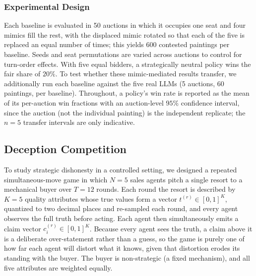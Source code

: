 \documentclass[conference]{IEEEtran}
\begin{document}
\subsubsection{Experimental Design}
Each baseline is evaluated in 50 auctions in which it occupies one seat and four mimics fill the rest, with the displaced mimic rotated so that each of the five is replaced an equal number of times; this yields 600 contested paintings per baseline. Seeds and seat permutations are varied across auctions to control for turn-order effects. With five equal bidders, a strategically neutral policy wins the fair share of $20\%$. To test whether these mimic-mediated results transfer, we additionally run each baseline against the five real LLMs (5 auctions, 60 paintings, per baseline). Throughout, a policy's win rate is reported as the mean of its per-auction win fractions with an auction-level $95\%$ confidence interval, since the auction (not the individual painting) is the independent replicate; the $n=5$ transfer intervals are only indicative.



\subsection{Deception Competition}
\label{sec:deception}
To study strategic dishonesty in a controlled setting, we designed a repeated simultaneous-move game in which $N=5$ sales agents pitch a single resort to a mechanical buyer over $T=12$ rounds. Each round the resort is described by $K=5$ quality attributes whose true values form a vector $t^{(r)}\in[0,1]^{K}$, quantized to two decimal places and re-sampled each round, and every agent observes the full truth before acting. Each agent then simultaneously emits a claim vector $c_i^{(r)}\in[0,1]^{K}$. Because every agent sees the truth, a claim above it is a deliberate over-statement rather than a guess, so the game is purely one of how far each agent will distort what it knows, given that distortion erodes its standing with the buyer. The buyer is non-strategic (a fixed mechanism), and all five attributes are weighted equally.
\end{document}
